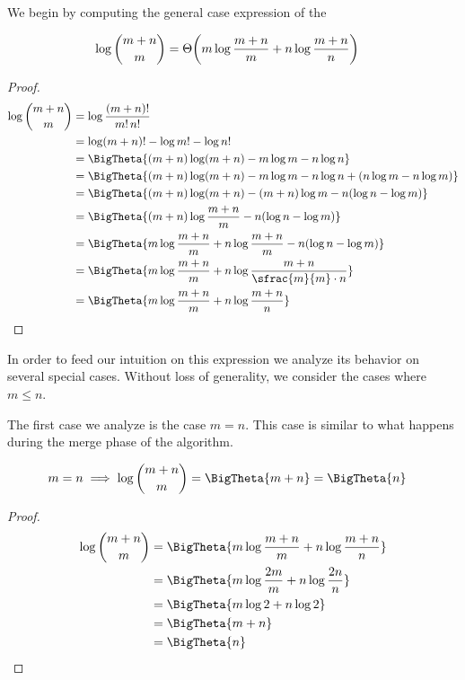 We begin by computing the general case expression of the \ITLB
\begin{lemma}
\begin{align*}
\log\binom{m+n}{m} &= \Theta\mleft(m \log\frac{m+n}{m} + n \log\frac{m+n}{n}\mright)
\end{align*}
\end{lemma}
\begin{proof}
\begin{align*}
\log\binom{m+n}{m} &= \log\frac{(m+n)!}{m! \, n!}\\
&= \log(m+n)! - \log m! - \log n!\\
&= \BigTheta{(m+n) \log(m+n) - m \log m - n \log n}\\
&= \BigTheta{(m+n) \log(m+n) - m \log m - n \log n + (n \log m - n \log m)}\\
&= \BigTheta{(m+n) \log(m+n) - (m+n) \log m - n (\log n - \log m)}\\
&= \BigTheta{(m+n) \log\frac{m+n}{m} - n (\log n - \log m)}\\
&= \BigTheta{m \log\frac{m+n}{m} + n \log\frac{m+n}{m} - n (\log n - \log m)}\\
&= \BigTheta{m \log\frac{m+n}{m} + n \log\frac{m+n}{\sfrac{m}{m} \cdot n}}\\
&= \BigTheta{m \log\frac{m+n}{m} + n \log\frac{m+n}{n}}\qedhere
\end{align*}
\end{proof}

In order to feed our intuition on this expression we analyze its behavior
on several special cases. Without loss of generality, we consider the cases
where \(m \leq n\).

The first case we analyze is the case $m = n$. This case is similar
to what happens during the merge phase of the \mergesort algorithm.
\begin{lemma}
\begin{align*}
m = n &\implies \log\binom{m+n}{m} = \BigTheta{m + n} = \BigTheta{n}
\end{align*}
\end{lemma}
\begin{proof}
\begin{align*}
\log\binom{m+n}{m} &= \BigTheta{m \log\frac{m+n}{m} + n \log\frac{m+n}{n}}\\
&= \BigTheta{m \log\frac{2m}{m} + n \log\frac{2n}{n}}\\
&= \BigTheta{m \log 2 + n \log 2}\\
&= \BigTheta{m + n}\\
&= \BigTheta{n}\qedhere
\end{align*}
\end{proof}

